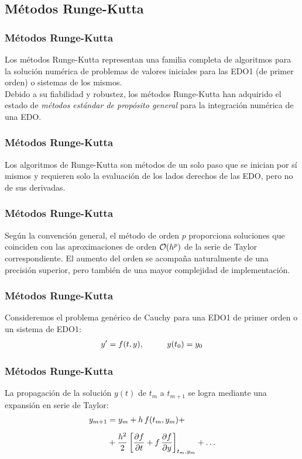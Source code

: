 \subsection{Métodos Runge-Kutta}
\begin{frame}
\frametitle{Métodos Runge-Kutta}
Los métodos Runge-Kutta representan una familia completa de algoritmos para la solución numérica de problemas de valores iniciales para las EDO1 (de primer orden) o sistemas de los mismos.
\\
\bigskip
Debido a su fiabilidad y robustez, los métodos Runge-Kutta han adquirido el estado de \emph{métodos estándar de propósito general} para la integración numérica de una EDO.
\end{frame}
\begin{frame}
\frametitle{Métodos Runge-Kutta}
Los algoritmos de Runge-Kutta son métodos de un solo paso que se inician por sí mismos y requieren solo la evaluación de los lados derechos de las EDO, pero no de sus derivadas.
\end{frame}
\begin{frame}
\frametitle{Métodos Runge-Kutta}
Según la convención general, el método de orden $p$ proporciona soluciones que coinciden con las aproximaciones de orden $\order{h^{p}}$ de la serie de Taylor correspondiente. El aumento del orden se acompaña naturalmente de una precisión superior, pero también de una mayor complejidad de implementación.
\end{frame}
\begin{frame}
\frametitle{Métodos Runge-Kutta}
Consideremos el problema genérico de Cauchy para una EDO1 de primer orden o un sistema de EDO1:
\begin{align}
{y}^{\prime} = f(t, y), \hspace{1cm} y(t_{0}) = y_{0}
\label{eq:ecuacion_12_23}
\end{align}
\end{frame}
\begin{frame}
\frametitle{Métodos Runge-Kutta}
La propagación de la solución $y(t)$ de $t_{m}$ a $t_{m+1}$ se logra mediante una expansión en serie de Taylor:
\begin{align}
\begin{aligned}
y_{m+1} &= y_{m} + h \, f(t_{m}, y_{m}) + \\[0.5em]
&+ \dfrac{h^{2}}{2} \left[ \pdv{f}{t} + f \, \pdv{f}{y} \right]_{t_{m}, y_{m}} + \ldots
\end{aligned}
\label{eq:ecuacion_12_24}
\end{align}
\end{frame}
